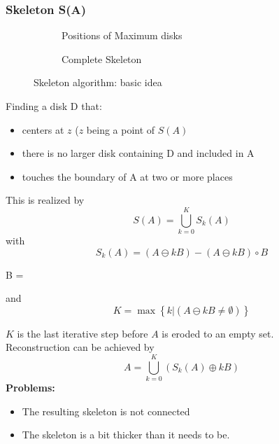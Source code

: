 \subsubsection{Skeleton S(A)}
\begin{figure}[h!]
\centering
\begin{subfigure}[b]{0.45\textwidth}
\centering
{}
\caption{Positions of Maximum disks}
\end{subfigure}
\begin{subfigure}[b]{0.45\textwidth}
\centering
{}
\caption{Complete Skeleton}
\end{subfigure}
\caption{Skeleton algorithm: basic idea}
\end{figure}
\begin{multicols}{2}
Finding a disk D that:
\begin{itemize}
\item centers at $z$ ($z$ being a point of $S(A)$
\item there is no larger disk containing D and included in A
\item touches the boundary of A at two or more places
\end{itemize}

This is realized by
	\[
		S(A) = \bigcup_{k=0}^{K} S_k(A)
	\]
with
	\[
		S_k(A) = (A \ominus kB) - (A \ominus kB) \circ B
	\]
\begin{center}
	B \quad = \quad {}
\end{center}

and
	\[
		K = \max\left\{ k | (A \ominus kB \neq \emptyset) \right\}
	\]

$K$ is the last iterative step before $A$ is eroded to an empty set. \\

Reconstruction can be achieved by
	\[
		A = \bigcup_{k=0}^{K}\left( S_k(A) \oplus kB \right)
	\]
\textbf{Problems:}
\begin{itemize}
	\item The resulting skeleton is not connected
	\item The skeleton is a bit thicker than it needs to be.
\end{itemize}
\end{multicols}

